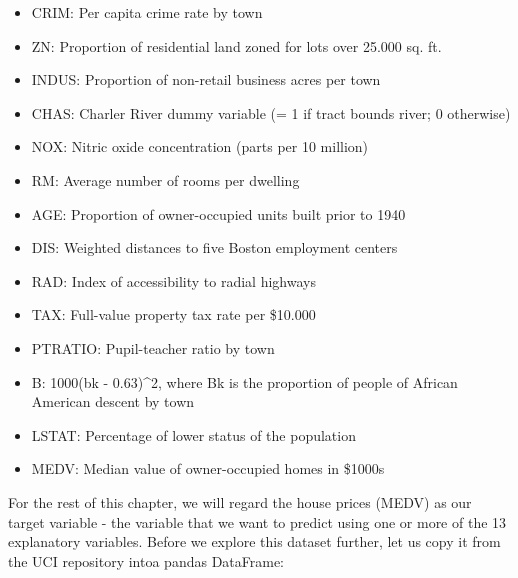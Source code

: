 \documentclass[11pt]{article}
\providecommand{\tightlist}{%
      \setlength{\itemsep}{0pt}\setlength{\parskip}{0pt}}
\begin{document}
\begin{itemize}
\tightlist
\item
  CRIM: Per capita crime rate by town
\item
  ZN: Proportion of residential land zoned for lots over 25.000 sq. ft.
\item
  INDUS: Proportion of non-retail business acres per town
\item
  CHAS: Charler River dummy variable (= 1 if tract bounds river; 0
  otherwise)
\item
  NOX: Nitric oxide concentration (parts per 10 million)
\item
  RM: Average number of rooms per dwelling
\item
  AGE: Proportion of owner-occupied units built prior to 1940
\item
  DIS: Weighted distances to five Boston employment centers
\item
  RAD: Index of accessibility to radial highways
\item
  TAX: Full-value property tax rate per \$10.000
\item
  PTRATIO: Pupil-teacher ratio by town
\item
  B: 1000(bk - 0.63)\^{}2, where Bk is the proportion of people of
  African American descent by town
\item
  LSTAT: Percentage of lower status of the population
\item
  MEDV: Median value of owner-occupied homes in \$1000s
\end{itemize}

For the rest of this chapter, we will regard the house prices (MEDV) as
our target variable - the variable that we want to predict using one or
more of the 13 explanatory variables. Before we explore this dataset
further, let us copy it from the UCI repository intoa pandas DataFrame:
\end{document}
